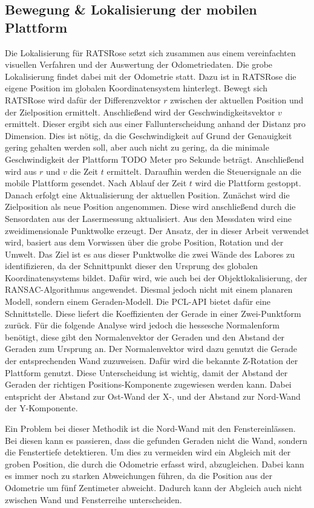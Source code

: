 \subsection{Bewegung \& Lokalisierung der mobilen Plattform}
\label{sec:impl-lopo}
Die Lokalisierung für RATSRose setzt sich zusammen aus einem vereinfachten visuellen Verfahren und der Auswertung der Odometriedaten. Die grobe Lokalisierung findet dabei mit der Odometrie statt. Dazu ist in RATSRose die eigene Position im globalen Koordinatensystem hinterlegt. Bewegt sich RATSRose wird dafür der Differenzvektor $r$ zwischen der aktuellen Position und der Zielposition ermittelt. Anschließend wird der Geschwindigkeitsvektor $v$ ermittelt. Dieser ergibt sich aus einer Fallunterscheidung anhand der Distanz pro Dimension. Dies ist nötig, da die Geschwindigkeit auf Grund der Genauigkeit gering gehalten werden soll, aber auch nicht zu gering, da die minimale Geschwindigkeit der Plattform TODO Meter pro Sekunde beträgt. Anschließend wird aus $r$ und $v$ die Zeit $t$ ermittelt. Daraufhin werden die Steuersignale an die mobile Plattform gesendet. Nach Ablauf der Zeit $t$ wird die Plattform gestoppt. Danach erfolgt eine Aktualisierung der aktuellen Position. Zunächst wird die Zielposition als neue Position angenommen. Diese wird anschließend durch die Sensordaten aus der Lasermessung aktualisiert. Aus den Messdaten wird eine zweidimensionale Punktwolke erzeugt.  Der Ansatz, der in dieser Arbeit verwendet wird, basiert aus dem Vorwissen über die grobe Position, Rotation und der Umwelt. Das Ziel ist es aus dieser Punktwolke die zwei Wände des Labores zu identifizieren, da der Schnittpunkt dieser den Ursprung des globalen Koordinatensystems bildet. Dafür wird, wie auch bei der Objektlokalisierung, der RANSAC-Algorithmus angewendet. Diesmal jedoch nicht mit einem planaren Modell, sondern einem Geraden-Modell. Die PCL-API bietet dafür eine Schnittstelle. Diese liefert die Koeffizienten der Gerade in einer Zwei-Punktform zurück. Für die folgende Analyse wird jedoch die hessesche Normalenform benötigt, diese gibt den Normalenvektor der Geraden und den Abstand der Geraden zum Ursprung an. Der Normalenvektor wird dazu genutzt die Gerade der entsprechenden Wand zuzuweisen. Dafür wird die bekannte Z-Rotation der Plattform genutzt. Diese Unterscheidung ist wichtig, damit der Abstand der Geraden der richtigen Positions-Komponente zugewiesen werden kann. Dabei entspricht der Abstand zur Ost-Wand der X-, und der Abstand zur Nord-Wand der Y-Komponente.

Ein Problem bei dieser Methodik ist die Nord-Wand mit den Fenstereinlässen. Bei diesen kann es passieren, dass die gefunden Geraden nicht die Wand, sondern die Fenstertiefe detektieren. Um dies zu vermeiden wird ein Abgleich mit der groben Position, die durch die Odometrie erfasst wird, abzugleichen. Dabei kann es immer noch zu starken Abweichungen führen, da die Position aus der Odometrie um fünf Zentimeter abweicht. Dadurch kann der Abgleich auch nicht zwischen Wand und Fensterreihe unterscheiden.


